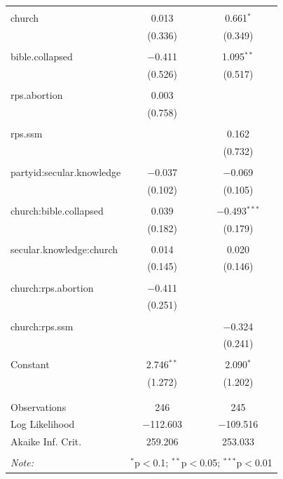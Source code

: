 \documentclass[12pt,letterpaper]{article}
\begin{document}
\begin{description}
\begin{table}[H]
\begin{tabular}{@{\extracolsep{5pt}}lcc}
		& & \\ 
		church & 0.013 & 0.661$^{*}$ \\ 
		& (0.336) & (0.349) \\ 
		& & \\ 
		bible.collapsed & $-$0.411 & 1.095$^{**}$ \\ 
		& (0.526) & (0.517) \\ 
		& & \\ 
		rps.abortion & 0.003 &  \\ 
		& (0.758) &  \\ 
		& & \\ 
		rps.ssm &  & 0.162 \\ 
		&  & (0.732) \\ 
		& & \\ 
		partyid:secular.knowledge & $-$0.037 & $-$0.069 \\ 
		& (0.102) & (0.105) \\ 
		& & \\ 
		church:bible.collapsed & 0.039 & $-$0.493$^{***}$ \\ 
		& (0.182) & (0.179) \\ 
		& & \\ 
		secular.knowledge:church & 0.014 & 0.020 \\ 
		& (0.145) & (0.146) \\ 
		& & \\ 
		church:rps.abortion & $-$0.411 &  \\ 
		& (0.251) &  \\ 
		& & \\ 
		church:rps.ssm &  & $-$0.324 \\ 
		&  & (0.241) \\ 
		& & \\ 
		Constant & 2.746$^{**}$ & 2.090$^{*}$ \\ 
		& (1.272) & (1.202) \\ 
		& & \\ 
		\hline \\[-1.8ex] 
		Observations & 246 & 245 \\ 
		Log Likelihood & $-$112.603 & $-$109.516 \\ 
		Akaike Inf. Crit. & 259.206 & 253.033 \\ 
		\hline 
		\hline \\[-1.8ex] 
		\textit{Note:}  & \multicolumn{2}{r}{$^{*}$p$<$0.1; $^{**}$p$<$0.05; $^{***}$p$<$0.01} \\ 
	\end{tabular} 
\end{table} 

\end{description}
\end{document}
